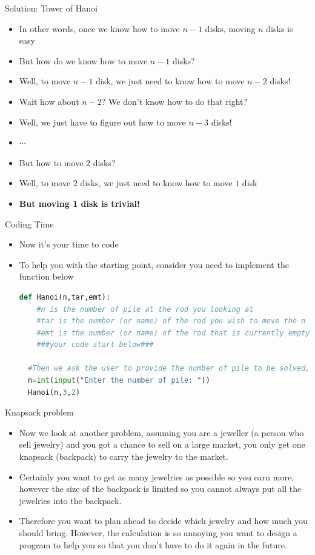\documentclass[10pt,xcolor={table,dvipsnames},t]{beamer}
\begin{document}
\begin{frame}{Solution: Tower of Hanoi}
\begin{itemize}
\item In other words, once we know how to move $n-1$ disks, moving $n$ disks is easy
\item But how do we know how to move $n-1$ disks?
\item Well, to move $n-1$ disk, we just need to know how to move $n-2$ disks!
\item Wait how about $n-2$? We don't know how to do that right?
\item Well, we just have to figure out how to move $n-3$ disks!
\item $\cdots$
\item But how to move $2$ disks?
\item Well, to move $2$ disks, we just need to know how to move $1$ disk
\item \textbf{But moving 1 disk is trivial!}
\end{itemize}
\end{frame}

\begin{frame}[fragile]{Coding Time}
  \begin{itemize}
    \item Now it's your time to code
    \item To help you with the starting point, consider you need to implement the function below
\begin{lstlisting}[language=python]
  def Hanoi(n,tar,emt):
    #n is the number of pile at the rod you looking at
    #tar is the number (or name) of the rod you wish to move the n pile to
    #emt is the number (or name) of the rod that is currently empty
    ###your code start below###

  #Then we ask the user to provide the number of pile to be solved, and call the function we just implemented.
  n=int(input("Enter the number of pile: "))
  Hanoi(n,3,2)
\end{lstlisting}
  \end{itemize}
\end{frame}

\begin{frame}[fragile]{Knapsack problem}
  \begin{itemize}
    \item Now we look at another problem, assuming you are a jeweller (a person who sell jewelry) and you got a chance to sell on a large market, you only get one knapsack (backpack) to carry the jewelry to the market.
    \item Certainly you want to get as many jewelries as possible so you earn more, however the size of the backpack is limited so you cannot always put all the jewelries into the backpack.
    \item Therefore you want to plan ahead to decide which jewelry and how much you should bring. However, the calculation is so annoying you want to design a program to help you so that you don't have to do it again in the future.
  \end{itemize}
\end{frame}
\end{document}
